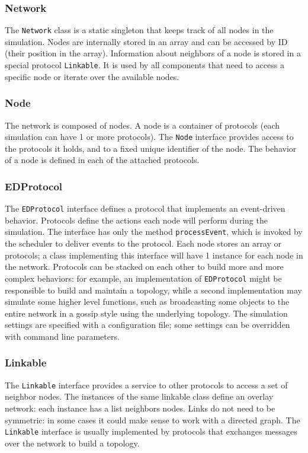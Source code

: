 \subsubsection{Network}
The \texttt{Network} class is a static singleton that keeps track of all nodes in the simulation.
Nodes are internally stored in an array and can be accessed by ID (their position in the array).
Information about neighbors of a node is stored in a special protocol \texttt{Linkable}.
It is used by all components that need to access a specific node or iterate over the available nodes.

\subsubsection{Node}
The network is composed of nodes.
A node is a container of protocols (each simulation can have \num{1} or more protocols).
The \texttt{Node} interface provides access to the protocols it holds, and to a fixed unique identifier of the node.
The behavior of a node is defined in each of the attached protocols.

\subsubsection{EDProtocol}
The \texttt{EDProtocol} interface defines a protocol that implements an event-driven behavior.
Protocols define the actions each node will perform during the simulation.
The interface has only the method \texttt{processEvent}, which is invoked by the scheduler to deliver events to the protocol.
Each node stores an array or protocols;
a class implementing this interface will have \num{1} instance for each node in the network.
Protocols can be stacked on each other to build more and more complex behaviors:
for example, an implementation of \texttt{EDProtocol} might be responsible to build and maintain a topology, while a second implementation may simulate some higher level functions, such as broadcasting some objects to the entire network in a gossip style using the underlying topology.
The simulation settings are specified with a configuration file;
some settings can be overridden with command line parameters.

\subsubsection{Linkable}
The \texttt{Linkable} interface provides a service to other protocols to access a set of neighbor nodes.
The instances of the same linkable class define an overlay network:
each instance has a list neighbors nodes.
Links do not need to be symmetric:
in some cases it could make sense to work with a directed graph.
The \texttt{Linkable} interface is usually implemented by protocols that exchanges messages over the network to build a topology.

